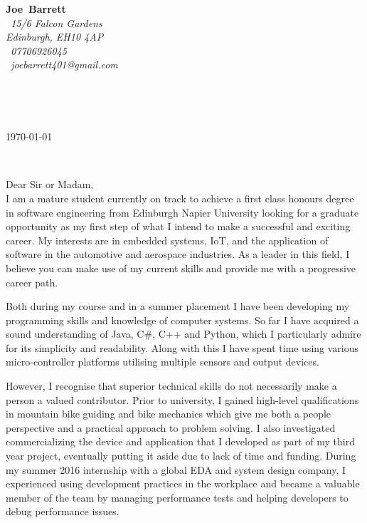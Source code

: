 \documentclass{article}
\makeatletter
\def\firstname{Joe}
\def\surname{Barrett}
\def\address{\faMapMarker~15/6 Falcon Gardens\\Edinburgh, EH10 4AP\\}
\def\phone{\faMobilePhone~07706926045}
\def\email{\faEnvelopeO~joebarrett401@gmail.com}
\def\FileAuthor{\firstname\ \surname}
\def\compName{}
\def\compAddress{}
\makeatother
\begin{document}
	\hfill%
\begin{minipage}[t]{.6\textwidth}
	\raggedleft%
	{\bfseries \FileAuthor}\\[.35ex]
	\small\itshape%
	\address[.35ex]
	\phone\\
	\email

\end{minipage}\\[1em]
%
\begin{minipage}[t]{.4\textwidth}
	\raggedright%
	{\bfseries \compName}\\[.35ex]
	\small\itshape%
	\compAddress
\end{minipage}
\hfill
\begin{minipage}[t]{.4\textwidth}
	\hfill
	\raggedleft
	\today
\end{minipage}\\[2em]
\raggedright
Dear Sir or Madam,\\[1.5em]
%

I am a mature student currently on track to achieve a first class honours degree in software engineering from Edinburgh Napier University looking for a graduate opportunity as my first step of what I intend to make a successful and exciting career. My interests are in embedded systems, IoT, and the application of software in the automotive and aerospace industries. As a leader in this field, I believe you can make use of my current skills and provide me with a progressive career path.

Both during my course and in a summer placement I have been developing my programming skills and knowledge of computer systems. So far I have acquired a sound understanding of Java, C\#, C++ and Python, which I particularly admire for its simplicity and readability. Along with this I have spent time using various micro-controller platforms utilising multiple sensors and output devices.

However, I recognise that superior technical skills do not necessarily make a person a valued contributor. Prior to university, I gained high-level qualifications in mountain bike guiding and bike mechanics which give me both a people perspective and a practical approach to problem solving. I also investigated commercializing the device and application that I developed as part of my third year project, eventually putting it aside due to lack of time and funding. During my summer 2016 internship with a global EDA and system design company, I experienced using development practices in the workplace and became a valuable member of the team by managing performance tests and helping developers to debug performance issues.
\end{document}

